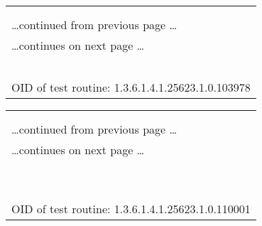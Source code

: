 \documentclass{article}
\begin{document}
\begin{longtable}{|p{}|}
\hline
\rowcolor{openvas_log}{\color{white}{Log (CVSS: 0.0) }}\\
\rowcolor{openvas_log}{\color{white}{NVT: Checks for open udp ports}}\\
\hline
\endfirsthead
\hfill\ldots continued from previous page \ldots \\
\hline
\endhead
\hline
\ldots continues on next page \ldots \\
\endfoot
\hline
\endlastfoot
\\
\rowcolor{white}{\verb=Open UDP ports: [None found]=}\\
\rowcolor{white}{\verb==}\\
\rowcolor{white}{\verb==}\\
\\
OID of test routine: 1.3.6.1.4.1.25623.1.0.103978\\
\end{longtable}

\begin{longtable}{|p{}|}
\hline
\rowcolor{openvas_log}{\color{white}{Log (CVSS: 0.0) }}\\
\rowcolor{openvas_log}{\color{white}{NVT: arachni (NASL wrapper)}}\\
\hline
\endfirsthead
\hfill\ldots continued from previous page \ldots \\
\hline
\endhead
\hline
\ldots continues on next page \ldots \\
\endfoot
\hline
\endlastfoot
\\
\rowcolor{white}{\verb=Arachni could not be found in your system path.=}\\
\rowcolor{white}{\verb=OpenVAS was unable to execute Arachni and to perform the scan you=}\\
\rowcolor{white}{\verb=requested.=}\\
\rowcolor{white}{\verb=Please make sure that Arachni is installed and that arachni is=}\\
\rowcolor{white}{\verb=available in the PATH variable defined for your environment.=}\\
\rowcolor{white}{\verb==}\\
\rowcolor{white}{\verb==}\\
\\
OID of test routine: 1.3.6.1.4.1.25623.1.0.110001\\
\end{longtable}
\end{document}
